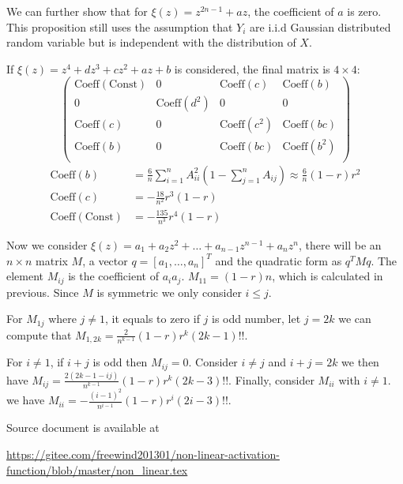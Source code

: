 \documentclass{article}
\begin{document}
We can further show that for $\xi(z) = z^{2n-1} + a z $, the coefficient of $a$ is zero. This proposition still uses the assumption that $Y_i$ are i.i.d Gaussian distributed random variable but is independent with the distribution of $X$.

If $\xi(z) = z^4 + d z^3 + c z^2 + a z + b $ is considered, the final matrix is $4\times 4$:
\begin{equation*}
\begin{pmatrix}
\textrm{Coeff}(\textrm{Const}) & 0 & \textrm{Coeff}(c) & \textrm{Coeff}(b) \\
0 & \textrm{Coeff}(d^2) & 0 & 0\\
\textrm{Coeff}(c) & 0 & \textrm{Coeff}(c^2) & \textrm{Coeff}(bc) \\
\textrm{Coeff}(b) &  0 & \textrm{Coeff}(bc) & \textrm{Coeff}(b^2) \\
\end{pmatrix}
\end{equation*}
\begin{align*}
\textrm{Coeff}(b) & = \frac{6}{n} \sum_{i=1}^n A_{ii}^2 (1 - \sum_{j=1}^n A_{ij}) \approx \frac{6}{n} (1-r)r^2 \\
\textrm{Coeff}(c) & =  -\frac{18}{n^2} r^3(1-r)\\
\textrm{Coeff}(\textrm{Const}) & = -\frac{135}{n^3} r^4(1-r)
\end{align*}

Now we consider $\xi(z) = a_1 + a_2 z^2 + \dots + a_{n-1} z^{n-1} + a_n z^n $, there will be an $n \times n $ matrix $M$, a vector  $q = [a_1, \dots, a_n]^T$ and  the quadratic form as $ q^T M q $. The element $M_{ij}$ is the coefficient of $a_ia_j$. $M_{11} = (1-r) n $, which is calculated in previous. Since $M$ is symmetric we only consider $i\leq j$.

For $M_{1j}$ where $j \neq 1$, it equals to zero if $j$ is odd number, let $j=2k$ we can compute that $M_{1,2k}=\frac{2}{n^{k-1}} (1-r)r^k (2k-1)!! $. 

For $i \neq 1$, if $i+j$ is odd then $M_{ij} = 0$. Consider $i \neq j$ and $i+j = 2k$ we then have $M_{ij} = \frac{2(2k-1-ij)}{n^{k-1}} (1-r)r^k (2k-3)!!$. Finally, consider $M_{ii}$ with $i \neq 1$. we have $M_{ii} = 
-\frac{(i-1)^2}{n^{i-1}} (1-r)r^i (2i-3)!!$.

Source document is available at 

\url{https://gitee.com/freewind201301/non-linear-activation-function/blob/master/non_linear.tex}
\end{document}
